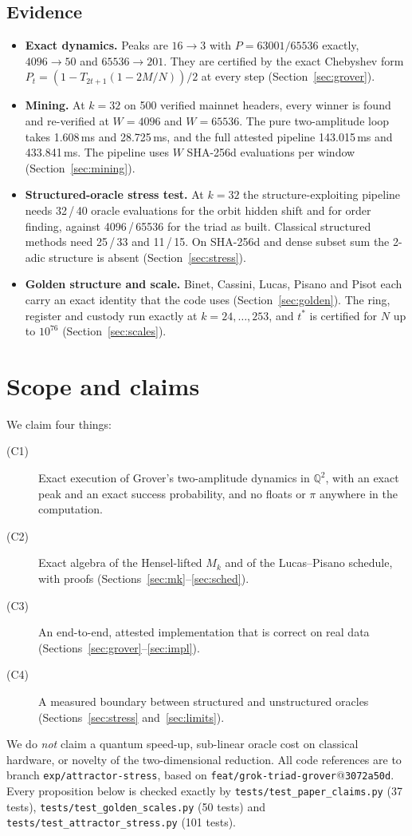 \documentclass[11pt]{article}
\theoremstyle{definition}
\newcommand{\Q}{\mathbb{Q}}
\newcommand{\code}[1]{\texttt{\small #1}}
\begin{document}
\subsection{Evidence}
\begin{itemize}
\item \textbf{Exact dynamics.} Peaks are $16\to3$ with $P=63001/65536$ exactly, $4096\to50$ and $65536\to201$. They
are certified by the exact Chebyshev form $P_t=(1-T_{2t+1}(1-2M/N))/2$ at every step (Section~\ref{sec:grover}).
\item \textbf{Mining.} At $k=32$ on 500 verified mainnet headers, every winner is found and re-verified at $W=4096$
and $W=65536$. The pure two-amplitude loop takes 1.608\,ms and 28.725\,ms, and the full attested pipeline 143.015\,ms
and 433.841\,ms. The pipeline uses $W$ SHA-256d evaluations per window (Section~\ref{sec:mining}).
\item \textbf{Structured-oracle stress test.} At $k=32$ the structure-exploiting pipeline needs 32\,/\,40 oracle
evaluations for the orbit hidden shift and for order finding, against 4096\,/\,65536 for the triad as built.
Classical structured methods need 25\,/\,33 and 11\,/\,15. On SHA-256d and dense subset sum the 2-adic structure is
absent (Section~\ref{sec:stress}).
\item \textbf{Golden structure and scale.} Binet, Cassini, Lucas, Pisano and Pisot each carry an exact identity that
the code uses (Section~\ref{sec:golden}). The ring, register and custody run exactly at $k=24,\dots,253$, and $t^*$
is certified for $N$ up to $10^{76}$ (Section~\ref{sec:scales}).
\end{itemize}

\section{Scope and claims}
We claim four things:
\begin{description}
\item[(C1)] Exact execution of Grover's two-amplitude dynamics in $\Q^2$, with an exact peak and an exact success probability,
and no floats or $\pi$ anywhere in the computation.
\item[(C2)] Exact algebra of the Hensel-lifted $M_k$ and of the Lucas--Pisano schedule, with proofs
(Sections~\ref{sec:mk}--\ref{sec:sched}).
\item[(C3)] An end-to-end, attested implementation that is correct on real data (Sections~\ref{sec:grover}--\ref{sec:impl}).
\item[(C4)] A measured boundary between structured and unstructured oracles (Sections~\ref{sec:stress} and~\ref{sec:limits}).
\end{description}
We do \emph{not} claim a quantum speed-up, sub-linear oracle cost on classical hardware, or novelty of the
two-dimensional reduction. All code references are to branch \code{exp/attractor-stress}, based on
\code{feat/grok-triad-grover}@\code{3072a50d}. Every proposition below is checked exactly by
\code{tests/test\_paper\_claims.py} (37 tests), \code{tests/test\_golden\_scales.py} (50 tests) and
\code{tests/test\_attractor\_stress.py} (101 tests).
\end{document}
